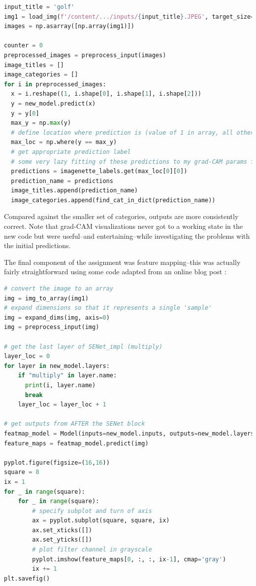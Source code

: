 \documentclass{article}
\begin{document}
\begin{lstlisting}[language=Python]
input_title = 'golf'
img1 = load_img(f'/content/.../inputs/{input_title}.JPEG', target_size=(224, 224))
images = np.asarray([np.array(img1)])

counter = 0
preprocessed_images = preprocess_input(images)
image_titles = []
image_categories = []
for i in preprocessed_images:
  x = i.reshape((1, i.shape[0], i.shape[1], i.shape[2]))
  y = new_model.predict(x)
  y = y[0]
  max_y = np.max(y)
  # define location where prediction is (value of 1 in array, all other values 0)
  max_loc = np.where(y == max_y)
  # get appropriate prediction label
  # some very lazy fitting of these predictions to my grad-CAM params from HW 2
  predictions = imagenette_labels.get(max_loc[0][0])
  prediction_name = predictions
  image_titles.append(prediction_name)
  image_categories.append(find_cat_in_dict(prediction_name))
\end{lstlisting}

\par Compared against the smaller set of categories, outputs are more consistently correct. 
Note that grad-CAM visualizations never got to a working state in the new code but were useful--and entertaining--while investigating the problems with the initial predictions.

\par The final component of the assignment was feature mapping--this was actually fairly straightforward using some code adapted from an online blog post \cite{Brownlee2019HowNetworks}:

\begin{lstlisting}[language=Python]
# convert the image to an array
img = img_to_array(img1)
# expand dimensions so that it represents a single 'sample'
img = expand_dims(img, axis=0)
img = preprocess_input(img)

# get the last layer of SENet_impl (multiply)
layer_loc = 0
for layer in new_model.layers:
    if "multiply" in layer.name:
      print(i, layer.name)
      break
    layer_loc = layer_loc + 1

# get outputs from AFTER the SENet block
featmap_model = Model(inputs=new_model.inputs, outputs=new_model.layers[layer_loc].output)
feature_maps = featmap_model.predict(img)

pyplot.figure(figsize=(16,16))
square = 8
ix = 1
for _ in range(square):
	for _ in range(square):
		# specify subplot and turn of axis
		ax = pyplot.subplot(square, square, ix)
		ax.set_xticks([])
		ax.set_yticks([])
		# plot filter channel in grayscale
		pyplot.imshow(feature_maps[0, :, :, ix-1], cmap='gray')
		ix += 1
plt.savefig()

\end{lstlisting}
\end{document}
